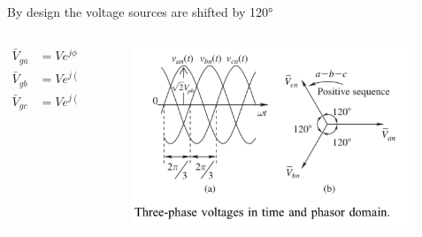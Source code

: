 \begin{frame}{By design the voltage sources are shifted by 120°}
    \begin{columns}
    \begin{column}{0.4\textwidth}
        \begin{align*}
        \bar{V}_{ga} &= V e^{j\phi_u} \\
        \bar{V}_{gb} &= V e^{j(\phi_u - 2 \pi / 3)} = \bar{V}_{ga} e^{-j 2 \pi / 3} \\
        \bar{V}_{gc} &= V e^{j(\phi_u - 4 \pi / 3)} = \bar{V}_{ga} e^{-j 4 \pi / 3}
        \end{align*}
    \end{column}
    \begin{column}{0.6\textwidth}
        \begin{figure}
            \centering
            \includegraphics[width=0.99\textwidth]{images/3ph_time_vs_phasor.PNG}
        \end{figure}
    \end{column}
\end{columns}

\end{frame}

